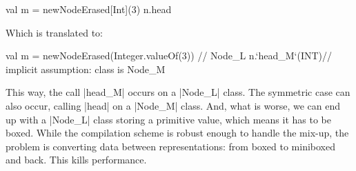 \begin{lstlisting-nobreak}
 val m = newNodeErased[Int](3)
 n.head
\end{lstlisting-nobreak}

Which is translated to:

\begin{lstlisting-nobreak}
 val m = newNodeErased(Integer.valueOf(3))    // Node_L
 n.`head_M`(INT)// implicit assumption: class is Node_M
\end{lstlisting-nobreak}

This way, the call |head_M| occurs on a |Node_L| class. The symmetric case can also occur, calling |head| on a |Node_M| class. And, what is worse, we can end up with a |Node_L| class storing a primitive value, which means it has to be boxed. While the compilation scheme is robust enough to handle the mix-up, the problem is converting data between representations: from boxed to miniboxed and back. This kills performance.
%
%
%
%
